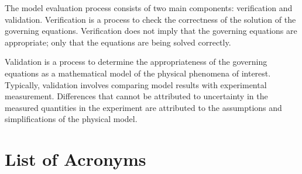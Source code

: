\documentclass[11pt]{book}
\begin{document}
The model evaluation process consists of two main components: verification and validation. Verification is a process to check the correctness of the solution of the governing equations. Verification does not imply that the governing equations are appropriate; only that the equations are being solved correctly.

Validation is a process to determine the appropriateness of the governing equations as a mathematical model of the physical phenomena of interest. Typically, validation involves comparing model results with experimental measurement. Differences that cannot be attributed to uncertainty in the measured quantities in the experiment are attributed to the assumptions and simplifications of the physical model.

\cleardoublepage
{}
{}
\tableofcontents

\cleardoublepage
{}
{}
\listoffigures

\cleardoublepage
{}
{}
\listoftables

\chapter{List of Acronyms}
\end{document}
